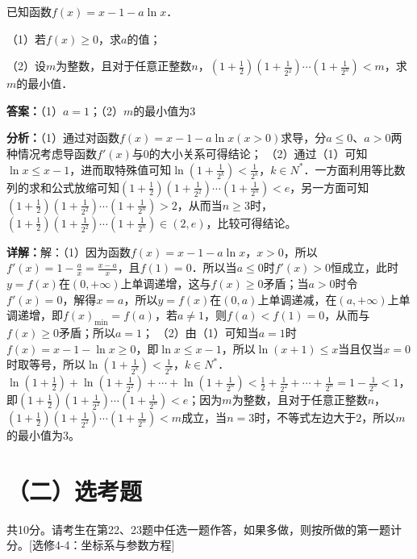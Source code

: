 \begin{question}[points=12]
已知函数$f(x)=x-1-a\ln x$．

（1）若$f(x)\ge 0$，求$a$的值；

（2）设$m$为整数，且对于任意正整数$n$，$(1+\frac{1}{2})(1+\frac{1}{2^2})\cdots(1+\frac{1}{2^n})<m$，求$m$的最小值．
\begin{solution}
\textbf{答案：}（1）$a=1$；（2）$m$的最小值为$3$

\textbf{分析：}（1）通过对函数$f(x)=x-1-a\ln x(x>0)$求导，分$a\le 0$、$a>0$两种情况考虑导函数$f'(x)$与$0$的大小关系可得结论；
（2）通过（1）可知$\ln x\le x-1$，进而取特殊值可知$\ln(1+\frac{1}{2^k})<\frac{1}{2^k}$，$k\in N^*$．一方面利用等比数列的求和公式放缩可知$(1+\frac{1}{2})(1+\frac{1}{2^2})\cdots(1+\frac{1}{2^n})<e$，另一方面可知$(1+\frac{1}{2})(1+\frac{1}{2^2})\cdots(1+\frac{1}{2^n})>2$，从而当$n\ge 3$时，$(1+\frac{1}{2})(1+\frac{1}{2^2})\cdots(1+\frac{1}{2^n})\in(2,e)$，比较可得结论。

\textbf{详解：}解：（1）因为函数$f(x)=x-1-a\ln x$，$x>0$，所以$f'(x)=1-\frac{a}{x}=\frac{x-a}{x}$，且$f(1)=0$．所以当$a\le 0$时$f'(x)>0$恒成立，此时$y=f(x)$在$(0,+\infty)$上单调递增，这与$f(x)\ge 0$矛盾；当$a>0$时令$f'(x)=0$，解得$x=a$，所以$y=f(x)$在$(0,a)$上单调递减，在$(a,+\infty)$上单调递增，即$f(x)_{\min}=f(a)$，若$a\neq 1$，则$f(a)<f(1)=0$，从而与$f(x)\ge 0$矛盾；所以$a=1$；
（2）由（1）可知当$a=1$时$f(x)=x-1-\ln x\ge 0$，即$\ln x\le x-1$，所以$\ln(x+1)\le x$当且仅当$x=0$时取等号，所以$\ln(1+\frac{1}{2^k})<\frac{1}{2^k}$，$k\in N^*$．$\ln(1+\frac{1}{2})+\ln(1+\frac{1}{2^2})+\cdots+\ln(1+\frac{1}{2^n})<\frac{1}{2}+\frac{1}{2^2}+\cdots+\frac{1}{2^n}=1-\frac{1}{2^n}<1$，即$(1+\frac{1}{2})(1+\frac{1}{2^2})\cdots(1+\frac{1}{2^n})<e$；因为$m$为整数，且对于任意正整数$n$，$(1+\frac{1}{2})(1+\frac{1}{2^2})\cdots(1+\frac{1}{2^n})<m$成立，当$n=3$时，不等式左边大于$2$，所以$m$的最小值为$3$。
\end{solution}
\end{question}

\section*{（二）选考题}
共10分。请考生在第22、23题中任选一题作答，如果多做，则按所做的第一题计分。[选修4-4：坐标系与参数方程]

